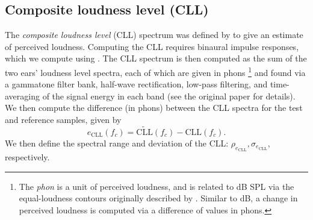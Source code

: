 \subsection{Composite loudness level (CLL)}\label{sec:04_Auditory_Models:Coloration_Metrics:Pulkki_CLL}
The \textit{composite loudness level} (CLL) spectrum was defined by \citet[section 1.1]{Pulkki1999} to give an estimate of perceived loudness.
Computing the CLL requires binaural impulse responses, which we compute using .
The CLL spectrum is then computed as the sum of the two ears' loudness level spectra, each of which are given in phons%
\footnote{The \textit{phon} is a unit of perceived loudness, and is related to dB SPL via the equal-loudness contours originally described by \citet{FletcherMunson1933}.
Similar to dB, a change in perceived loudness is computed via a difference of values in phons.}
and found via a gammatone filter bank, half-wave rectification, low-pass filtering, and time-averaging of the signal energy in each band (see the original paper for details).
We then compute the difference (in phons) between the CLL spectra for the test and reference samples, given by
\begin{equation}\label{eq:04_Auditory_Models:Pulkki_CLL}
e_\text{CLL}(f_c) = \widetilde{\text{CLL}}(f_c) - \text{CLL}(f_c).
\end{equation}
We then define the spectral range and deviation of the CLL: $\rho_{e_\text{CLL}}, \sigma_{e_\text{CLL}}$, respectively.

